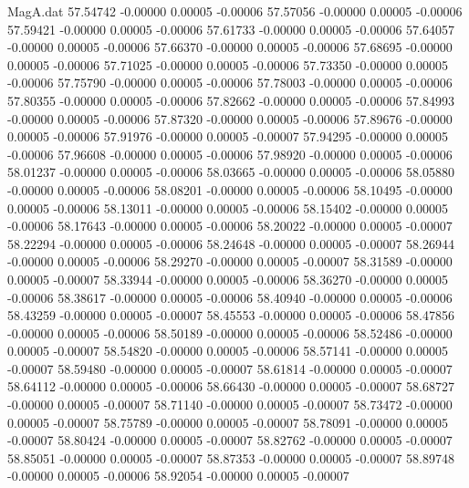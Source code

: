 \begin{filecontents}{MagA.dat}
  57.54742   -0.00000    0.00005   -0.00006
  57.57056   -0.00000    0.00005   -0.00006
  57.59421   -0.00000    0.00005   -0.00006
  57.61733   -0.00000    0.00005   -0.00006
  57.64057   -0.00000    0.00005   -0.00006
  57.66370   -0.00000    0.00005   -0.00006
  57.68695   -0.00000    0.00005   -0.00006
  57.71025   -0.00000    0.00005   -0.00006
  57.73350   -0.00000    0.00005   -0.00006
  57.75790   -0.00000    0.00005   -0.00006
  57.78003   -0.00000    0.00005   -0.00006
  57.80355   -0.00000    0.00005   -0.00006
  57.82662   -0.00000    0.00005   -0.00006
  57.84993   -0.00000    0.00005   -0.00006
  57.87320   -0.00000    0.00005   -0.00006
  57.89676   -0.00000    0.00005   -0.00006
  57.91976   -0.00000    0.00005   -0.00007
  57.94295   -0.00000    0.00005   -0.00006
  57.96608   -0.00000    0.00005   -0.00006
  57.98920   -0.00000    0.00005   -0.00006
  58.01237   -0.00000    0.00005   -0.00006
  58.03665   -0.00000    0.00005   -0.00006
  58.05880   -0.00000    0.00005   -0.00006
  58.08201   -0.00000    0.00005   -0.00006
  58.10495   -0.00000    0.00005   -0.00006
  58.13011   -0.00000    0.00005   -0.00006
  58.15402   -0.00000    0.00005   -0.00006
  58.17643   -0.00000    0.00005   -0.00006
  58.20022   -0.00000    0.00005   -0.00007
  58.22294   -0.00000    0.00005   -0.00006
  58.24648   -0.00000    0.00005   -0.00007
  58.26944   -0.00000    0.00005   -0.00006
  58.29270   -0.00000    0.00005   -0.00007
  58.31589   -0.00000    0.00005   -0.00007
  58.33944   -0.00000    0.00005   -0.00006
  58.36270   -0.00000    0.00005   -0.00006
  58.38617   -0.00000    0.00005   -0.00006
  58.40940   -0.00000    0.00005   -0.00006
  58.43259   -0.00000    0.00005   -0.00007
  58.45553   -0.00000    0.00005   -0.00006
  58.47856   -0.00000    0.00005   -0.00006
  58.50189   -0.00000    0.00005   -0.00006
  58.52486   -0.00000    0.00005   -0.00007
  58.54820   -0.00000    0.00005   -0.00006
  58.57141   -0.00000    0.00005   -0.00007
  58.59480   -0.00000    0.00005   -0.00007
  58.61814   -0.00000    0.00005   -0.00007
  58.64112   -0.00000    0.00005   -0.00006
  58.66430   -0.00000    0.00005   -0.00007
  58.68727   -0.00000    0.00005   -0.00007
  58.71140   -0.00000    0.00005   -0.00007
  58.73472   -0.00000    0.00005   -0.00007
  58.75789   -0.00000    0.00005   -0.00007
  58.78091   -0.00000    0.00005   -0.00007
  58.80424   -0.00000    0.00005   -0.00007
  58.82762   -0.00000    0.00005   -0.00007
  58.85051   -0.00000    0.00005   -0.00007
  58.87353   -0.00000    0.00005   -0.00007
  58.89748   -0.00000    0.00005   -0.00006
  58.92054   -0.00000    0.00005   -0.00007

\end{filecontents}

